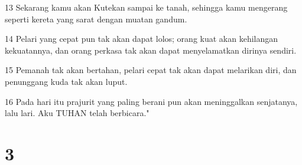 \par 13 Sekarang kamu akan Kutekan sampai ke tanah, sehingga kamu mengerang seperti kereta yang sarat dengan muatan gandum.
\par 14 Pelari yang cepat pun tak akan dapat lolos; orang kuat akan kehilangan kekuatannya, dan orang perkasa tak akan dapat menyelamatkan dirinya sendiri.
\par 15 Pemanah tak akan bertahan, pelari cepat tak akan dapat melarikan diri, dan penunggang kuda tak akan luput.
\par 16 Pada hari itu prajurit yang paling berani pun akan meninggalkan senjatanya, lalu lari. Aku TUHAN telah berbicara."

\chapter{3}

